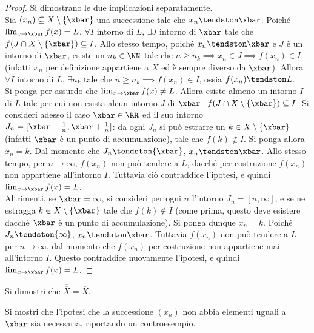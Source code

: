 \documentclass[11pt]{article}
\begin{document}
	\begin{proof}
		Si dimostrano le due implicazioni separatamente. \\
		
		\rightproof Sia $(x_n) \subseteq X \setminus \{\xbar\}$ una successione tale che
		$x_n \tendston \xbar$. Poiché $\lim_{x \to \xbar} f(x) = L$, $\forall I$ intorno di
		$L$, $\exists J$ intorno di $\xbar$ tale che $f(J \cap X \setminus \{\xbar\}) \subseteq I$.
		Allo stesso tempo, poiché $x_n \tendston \xbar$ e $J$ è un intorno di $\xbar$, esiste un $n_k \in \NN$
		tale che $n \geq n_k \implies x_n \in J \implies f(x_n) \in I$ (infatti $x_n$ per definizione
		appartiene a $X$ ed è sempre diverso da $\xbar$). Allora $\forall I$ intorno di $L$, $\exists n_k$
		tale che $n \geq n_k \implies f(x_n) \in I$, ossia $f(x_n) \tendston L$. \\
		
		\leftproof Si ponga per assurdo che $\lim_{x \to \xbar} f(x) \neq L$. Allora esiste almeno
		un intorno $I$ di $L$ tale per cui non esista alcun intorno $J$ di $\xbar \mid f(J \cap X \setminus \{\xbar\}) \subseteq I$. Si consideri adesso il caso $\xbar \in \RR$ ed il suo intorno $J_n = [\xbar - \frac{1}{n}, \xbar + \frac{1}{n}]$: da ogni $J_n$ si può estrarre un $k \in X \setminus \{\xbar\}$
		(infatti $\xbar$ è un punto di accumulazione), tale che $f(k) \notin I$. Si ponga allora $x_n = k$.
		Dal momento che $J_n \tendston \{\xbar\}$, $x_n \tendston \xbar$. Allo stesso tempo, per $n \to \infty$, $f(x_n)$ non può tendere a $L$, dacché per costruzione $f(x_n)$ non appartiene all'intorno
		$I$. Tuttavia ciò contraddice l'ipotesi, e quindi $\lim_{x \to \xbar} f(x) = L$. \\
		
		Altrimenti, se $\xbar = \infty$, si consideri per ogni $n$ l'intorno $J_n = [n, \infty]$, e se ne
		estragga $k \in X \setminus \{\xbar\}$ tale che $f(k) \notin I$ (come prima, questo deve esistere
		dacché $\xbar$ è un punto di accumulazione). Si ponga dunque $x_n = k$. Poiché $J_n \tendston \{\infty\}$, $x_n \tendston \xbar$. Tuttavia $f(x_n)$ non può tendere a $L$ per $n \to \infty$,
		dal momento che $f(x_n)$ per costruzione non appartiene mai all'intorno $I$. Questo contraddice
		nuovamente l'ipotesi, e quindi $\lim_{x \to \xbar} f(x) = L$.
	\end{proof}
	
	\begin{exercise} Si dimostri che $\overline{\overline{X}} = \overline{X}$.
	\end{exercise}
	
	\begin{exercise} Si mostri che l'ipotesi che la successione $(x_n)$ non abbia elementi uguali
		a $\xbar$ sia necessaria, riportando un controesempio.
	\end{exercise}
\end{document}
